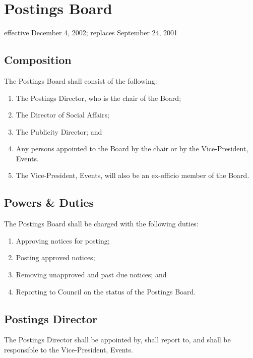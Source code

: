 \section{Postings Board}
effective December 4, 2002; replaces September 24, 2001

\subsection{Composition}
The Postings Board shall consist of the following:
\begin{enumerate}
\item The Postings Director, who is the chair of the Board;
\item The Director of Social Affairs;
\item The Publicity Director; and
\item Any persons appointed to the Board by the chair or by the Vice-President, Events.
\item The Vice-President, Events, will also be an ex-officio member of the Board.
\end{enumerate}

\subsection{Powers \& Duties}
The Postings Board shall be charged with the following duties:
\begin{enumerate}
\item Approving notices for posting;
\item Posting approved notices;
\item Removing unapproved and past due notices; and
\item Reporting to Council on the status of the Postings Board.
\end{enumerate}

\subsection{Postings Director}
The Postings Director shall be appointed by, shall report to, and shall be responsible to the Vice-President, Events.

